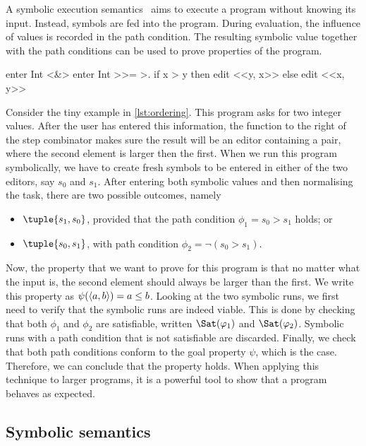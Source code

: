 A symbolic execution semantics~\cite{King1975,Boyer1975} aims to execute a program without knowing its input.
Instead, symbols are fed into the program.
During evaluation, the influence of values is recorded in the path condition.
The resulting symbolic value together with the path conditions can be used to prove properties of the program.

\begin{TASK}[
    float=ht,
    caption={Ordering of tuple elements.},
    captionpos=b,
    label=lst:ordering]
  enter Int <&> enter Int >>= >. if x > y then edit <<y, x>> else edit <<x, y>>
\end{TASK}

Consider the tiny example in \cref{lst:ordering}.
This program asks for two integer values.
After the user has entered this information, the function to the right of the step combinator makes sure the result will be an editor containing a pair,
where the second element is larger then the first.
When we run this program symbolically, we have to create fresh symbols to be entered in either of the two editors, say $s_0$ and $s_1$.
After entering both symbolic values and then normalising the task, there are two possible outcomes, namely
\begin{itemize}
  \item $\tuple{s_1,s_0}$, provided that the path condition $\phi_1 = s_0 > s_1$ holds; or
  \item $\tuple{s_0,s_1}$, with path condition $\phi_2 = \lnot (s_0 > s_1)$.
\end{itemize}

Now, the property that we want to prove for this program is that no matter what the input is, the second element should always be larger than the first.
We write this property as $\psi(\langle a, b\rangle)= a \leq b$.
Looking at the two symbolic runs, we first need to verify that the symbolic runs are indeed viable.
This is done by checking that both $\phi_1$ and $\phi_2$ are satisfiable, written $\Sat(\phi_1)$ and $\Sat(\phi_2)$.
Symbolic runs with a path condition that is not satisfiable are discarded. 
Finally, we check that both path conditions conform to the goal property $\psi$, which is the case.
Therefore, we can conclude that the property holds.
When applying this technique to larger programs, it is a powerful tool to show that a program behaves as expected.


\subsection{Symbolic semantics}
\label{sub:symbolic-semantics}


